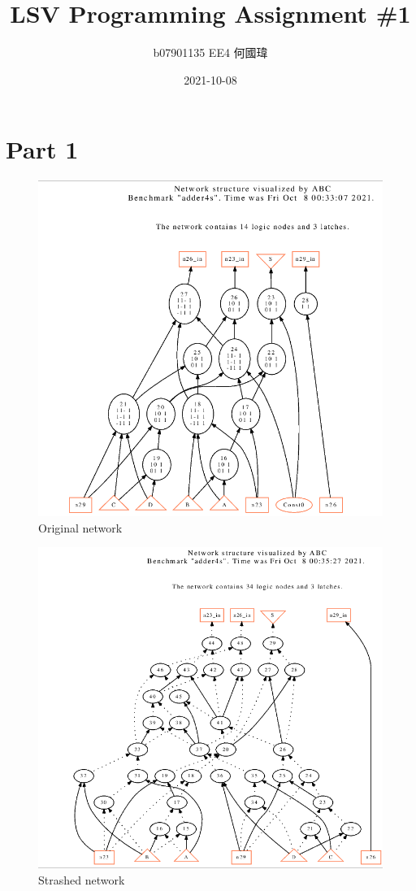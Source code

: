 \documentclass{article}
\title{LSV Programming Assignment \#1}
\author{b07901135 EE4 何國瑋}
\date{2021-10-08}
\begin{document}
    \maketitle

    \section{Part 1}


    \begin{figure}[h]
        \begin{minipage}{0.99\textwidth}
        \centering
        \includegraphics[width=.9\textwidth]{img/blif.png}
        \caption{Original network}
        \label{fig:blif}
        \end{minipage}
    \end{figure}
    \begin{figure}[h]
        \begin{minipage}{0.99\textwidth}
        \centering
        \includegraphics[width=.9\textwidth]{img/strash.png}
        \caption{Strashed network}
        \label{fig:strash}
        \end{minipage}
    \end{figure}
\end{document}
